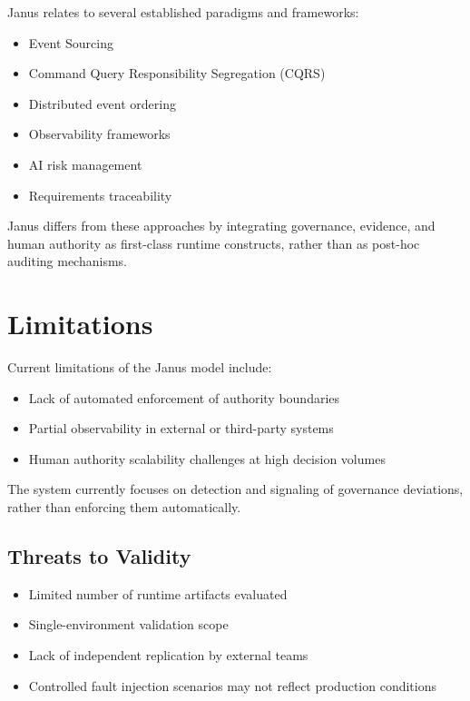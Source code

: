 \documentclass[conference]{IEEEtran}
\begin{document}
Janus relates to several established paradigms and frameworks:

\begin{itemize}
    \item Event Sourcing~\cite{fowler}
    \item Command Query Responsibility Segregation (CQRS)~\cite{young}
    \item Distributed event ordering~\cite{lamport}
    \item Observability frameworks~\cite{otel}
    \item AI risk management~\cite{nist}
    \item Requirements traceability~\cite{gotel}
\end{itemize}

Janus differs from these approaches by integrating governance, evidence, and
human authority as first-class runtime constructs, rather than as post-hoc
auditing mechanisms.

\section{Limitations}

Current limitations of the Janus model include:

\begin{itemize}
    \item Lack of automated enforcement of authority boundaries
    \item Partial observability in external or third-party systems
    \item Human authority scalability challenges at high decision volumes
\end{itemize}

The system currently focuses on detection and signaling of governance deviations,
rather than enforcing them automatically.

\subsection{Threats to Validity}
\begin{itemize}
    \item Limited number of runtime artifacts evaluated
    \item Single-environment validation scope
    \item Lack of independent replication by external teams
    \item Controlled fault injection scenarios may not reflect production conditions
\end{itemize}
\end{document}

